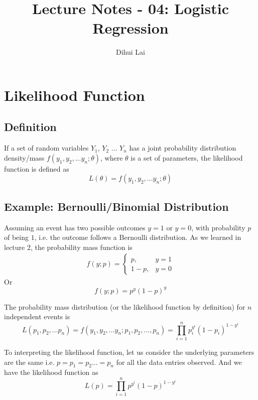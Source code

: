 \documentclass[12pt, oneside]{article}
\title{Lecture Notes - 04: Logistic Regression}
\author{Dihui Lai}
\begin{document}
\maketitle
\tableofcontents

\vspace{.25in}

\section{Likelihood Function}
\subsection{Definition}
If a set of random variables $Y_1$, $Y_2$ ... $Y_n$ has a joint probability distribution density/mass $f(y_1, y_2, ...y_n;\theta)$, where $\theta$ is a set of parameters, the likelihood function is defined as 
\begin{equation}
L(\theta)=f(y_1, y_2, ...y_n; \theta)
\end{equation}

\subsection{Example: Bernoulli/Binomial Distribution}
Assuming an event has two possible outcomes $y=1$ or $y=0$, with probability $p$ of being $1$, i.e. the outcome follows a Bernoulli distribution. As we learned in lecture 2, the probability mass function is 
\begin{align*}
f(y; p)=
\begin{cases}
p, &y=1\\
1-p,  &y=0
\end{cases}
\end{align*}
Or 
$$f(y;p)=p^y(1-p)^y$$

The probability mass distribution (or the likelihood function by definition) for $n$ independent events is
$$L(p_1, p_2,...p_n)=f(y_1, y_2, ...y_n; p_1, p_2, ..., p_n)=\prod_{i=1}^{n}p_{i}^{y^i}(1-p_{i})^{1-y^{i}}$$

To interpreting the likelihood function, let us consider the underlying parameters are the same i.e. $p=p_1=p_2...=p_n$ for all the data entries observed. And we have the likelihood function as
$$L(p)={\prod_{i=1}^{n}p^{y^i}(1-p)^{1-y^{i}}}$$
\end{document}
